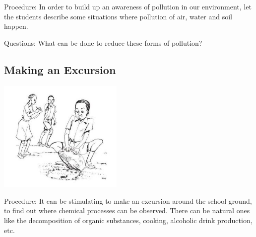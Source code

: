 \begin{multicols}{2}
\begin{description*}
\item[Procedure:]{In order to build up an awareness of pollution
in our environment, let the students describe
some situations where pollution of air, water
and soil happen.}
\item[Questions:]{What can be done to reduce these forms of pollution?}
\end{description*}

\subsection{Making an Excursion}

\begin{center}
\includegraphics[width=0.45\textwidth]{./img/source/excursion.jpg}
\end{center}

\begin{description*}
\item[Procedure:]{It can be stimulating to make an excursion
around the school ground, to find out where
chemical processes can be observed. There can
be natural ones like the decomposition of organic
substances, cooking, alcoholic drink
production, etc.}
\end{description*}


\end{multicols}
